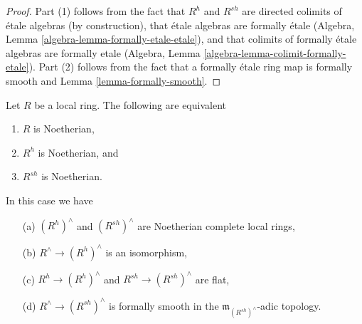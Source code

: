 \begin{proof}
Part (1) follows from the fact that $R^h$ and $R^{sh}$ are directed
colimits of \'etale algebras (by construction), that \'etale algebras
are formally \'etale
(Algebra, Lemma \ref{algebra-lemma-formally-etale-etale}),
and that colimits of formally \'etale algebras are formally etale
(Algebra, Lemma \ref{algebra-lemma-colimit-formally-etale}).
Part (2) follows from the fact that a formally \'etale ring
map is formally smooth and Lemma \ref{lemma-formally-smooth}.
\end{proof}

\begin{lemma}
\label{lemma-henselization-noetherian}
Let $R$ be a local ring. The following are equivalent
\begin{enumerate}
\item $R$ is Noetherian,
\item $R^h$ is Noetherian, and
\item $R^{sh}$ is Noetherian.
\end{enumerate}
In this case we have
\begin{enumerate}
\item[(a)] $(R^h)^\wedge$ and $(R^{sh})^\wedge$ are Noetherian complete
local rings,
\item[(b)] $R^\wedge \to (R^h)^\wedge$ is an isomorphism,
\item[(c)] $R^h \to (R^h)^\wedge$ and $R^{sh} \to (R^{sh})^\wedge$ are flat,
\item[(d)] $R^\wedge \to (R^{sh})^\wedge$ is formally smooth in
the $\mathfrak m_{(R^{sh})^\wedge}$-adic topology.
\end{enumerate}
\end{lemma}

